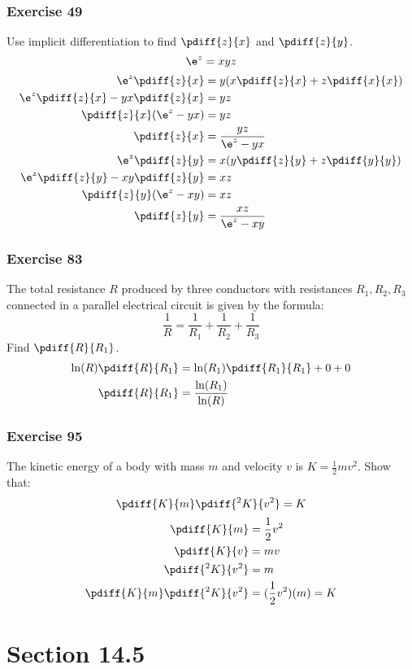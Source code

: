 \documentclass[letterpaper, 12pt]{math}
\begin{document}
\subsubsection*{Exercise 49}
Use implicit differentiation to find \( \pdiff{z}{x} \) and \( \pdiff{z}{y} \).
\[ \e^z = xyz \]
\begin{align*}
  \e^z\pdiff{z}{x} &= y(x\pdiff{z}{x}+z\pdiff{x}{x}) \\
  \e^z\pdiff{z}{x}-yx\pdiff{z}{x} &= yz \\
  \pdiff{z}{x}(\e^z-yx) &= yz \\
  \pdiff{z}{x} &= \frac{yz}{\e^z-yx} \\
  \e^z\pdiff{z}{y} &= x(y\pdiff{z}{y}+z\pdiff{y}{y}) \\
  \e^z\pdiff{z}{y}-xy\pdiff{z}{y} &= xz \\
  \pdiff{z}{y}(\e^z-xy) &= xz \\
  \pdiff{z}{y} &= \frac{xz}{\e^z-xy}
\end{align*}

\subsubsection*{Exercise 83}
The total resistance \( R \) produced by three conductors with resistances
\( R_1,R_2,R_3 \) connected in a parallel electrical circuit is given by
the formula:
\[ \frac{1}{R} = \frac{1}{R_1}+\frac{1}{R_2}+\frac{1}{R_3} \]
Find \( \pdiff{R}{R_1} \).
\begin{align*}
  \ln(R)\pdiff{R}{R_1} &= \ln(R_1)\pdiff{R_1}{R_1}+0+0 \\
  \pdiff{R}{R_1} &= \frac{\ln(R_1)}{\ln(R)}
\end{align*}

\subsubsection*{Exercise 95}
The kinetic energy of a body with mass \( m \) and velocity \( v \) is \( K =
\frac{1}{2}mv^2 \). Show that:
\[ \pdiff{K}{m}\pdiff{^2K}{v^2} = K \]
\begin{align*}
  \pdiff{K}{m} &= \frac{1}{2}v^2 \\
  \pdiff{K}{v} &= mv \\
  \pdiff{^2K}{v^2} &= m \\
  \pdiff{K}{m}\pdiff{^2K}{v^2} &= (\frac{1}{2}v^2)(m) = K
\end{align*}

\section*{Section 14.5}
\end{document}
